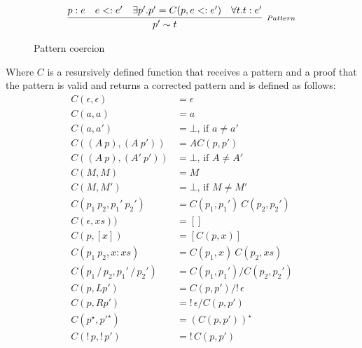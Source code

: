 \begin{figure*}[ht]
    \[
        \begin{array}{ccc}
            \multicolumn{3}{c}{
                \infer[_{Pattern}]
                    {p' \sim t}
                    {p : e & e <: e' & \exists p' . p' = C(p, e <: e') & \forall t. t:e'}
            }
        \end{array}
    \]
    \centering
    \caption{Pattern coercion}
    \label{fig:pattern-coercion}
\end{figure*}
Where \(C\) is a resursively defined function that receives a pattern and a proof
that the pattern is valid and returns a corrected pattern and is defined as follows:
\[
    \begin{array}{ll}
        C(\epsilon, \epsilon)             & = \epsilon \\
        C(a, a)                           & = a \\
        C(a, a')                          & = \bot\text{, if } a \neq a' \\
        C((A\:p), (A\:p'))                & = A C(p, p') \\
        C((A\:p), (A'\:p'))               & = \bot\text{, if } A \neq A' \\
        C(M, M)                           & = M \\
        C(M, M')                          & = \bot\text{, if } M \neq M' \\
        C(p_1\:p_2, p_1'\:p_2')           & = C(p_1, p_1')\:C(p_2, p_2') \\
        C(\epsilon, xs))                  & = [] \\
        C(p, [x])                         & = [C(p, x)] \\
        C(p_1\:p_2, x:xs)                 & = C(p_1, x) \: C(p_2, xs) \\
        C(p_1 \,/\, p_2, p_1' \,/\, p_2') & = C(p_1, p_1') / C(p_2, p_2') \\
        C(p, L p')                        & = C(p, p') / !\,\epsilon \\
        C(p, R p')                        & = !\,\epsilon / C(p, p') \\
        C(p^\star, {p'}^\star)            & = (C(p, p'))^\star \\
        C(!\,p, !\,p')                    & = !\,C(p, p') \\
    \end{array}
\]


